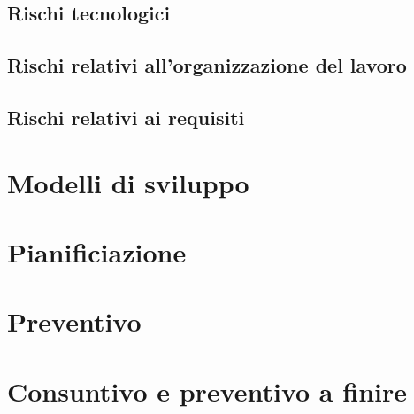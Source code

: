 \documentclass[a4paper, oneside, openany, dvipsnames, table]{article}
\begin{document}
	\subsection{Rischi tecnologici}
	\subsection{Rischi relativi all'organizzazione del lavoro}
	\subsection{Rischi relativi ai requisiti}
\section{Modelli di sviluppo}
\section{Pianificiazione}
\section{Preventivo}
\section{Consuntivo e preventivo a finire}
\end{document}
